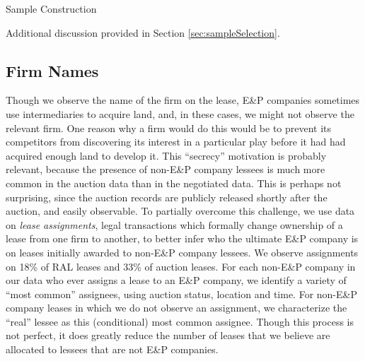 \documentclass[12pt]{article}
\begin{document}
\begin{appendices}
\begin{table}[H]
	\begin{center}
	\begin{threeparttable}
		\caption{Sample Construction}
		\label{tab:waterfall}
		\small
		            
		\footnotesize
		\begin{tablenotes}
			\item Additional discussion provided in Section \ref{sec:sampleSelection}.
		\end{tablenotes}
	\end{threeparttable}
	\end{center}
\end{table}

\subsection{Firm Names \label{sec:FirmNameCleaning}}
Though we observe the name of the firm on the lease, E\&P companies sometimes use intermediaries to acquire land, and, in these cases, we might not observe the relevant firm. One reason why a firm would do this would be to prevent its competitors from discovering its interest in a particular play before it had had acquired enough land to develop it. This ``secrecy'' motivation is probably relevant, because the presence of non-E\&P company lessees is much more common in the auction data than in the negotiated data. This is perhaps not surprising, since the auction records are publicly released shortly after the auction, and easily observable.  To partially overcome this challenge, we use data on \textit{lease assignments}, legal transactions which formally change ownership of a lease from one firm to another, to better infer who the ultimate E\&P company is on leases initially awarded to non-E\&P company lessees. We observe assignments on 18\% of RAL leases and 33\% of auction leases. For each non-E\&P company in our data who ever assigns a lease to an E\&P company, we identify a variety of ``most common'' assignees, using auction status, location and time.  For non-E\&P company leases in which we do not observe an assignment, we characterize the ``real'' lessee as this (conditional) most common assignee.  Though this process is not perfect, it does greatly reduce the number of leases that we believe are allocated to lessees that are not E\&P companies.

\pagebreak


\end{appendices}
\end{document}

